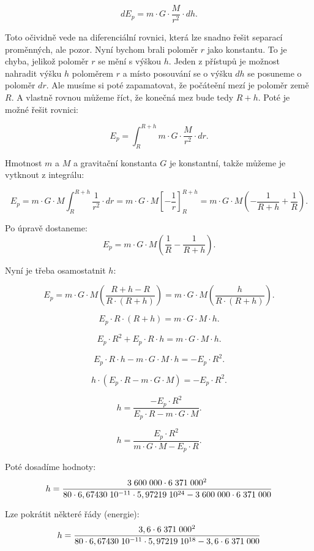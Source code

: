 \documentclass{article}
\begin{document}
$$
    dE_p = m \cdot G \cdot \frac{M}{r^2} \cdot dh.
$$

Toto očividně vede na diferenciální rovnici, která lze snadno řešit separací proměnných, ale pozor. Nyní bychom brali poloměr $r$ jako konstantu. To je chyba, jelikož poloměr $r$ se mění s výškou $h$. Jeden z přístupů je možnost nahradit výšku $h$ poloměrem $r$ a místo posouvání se o výšku $dh$ se posuneme o poloměr $dr$. Ale musíme si poté zapamatovat, že počáteění mezí je poloměr země $R$. A vlastně rovnou můžeme říct, že konečná mez bude tedy $R + h$. Poté je možné řešit rovnici:

$$
    E_p = \int_{R}^{R + h} m \cdot G \cdot \frac{M}{r^2} \cdot dr.
$$

Hmotnost $m$ a $M$ a gravitační konstanta $G$ je konstantní, takže můžeme je vytknout z integrálu:

$$
    E_p = m \cdot G \cdot M \int_{R}^{R + h} \frac{1}{r^2} \cdot dr = m \cdot G \cdot M \left[ - \frac{1}{r} \right]_{R}^{R + h} = m \cdot G \cdot M \left( - \frac{1}{R + h} + \frac{1}{R} \right).
$$

Po úpravě dostaneme:
$$
    E_p = m \cdot G \cdot M \left( \frac{1}{R} - \frac{1}{R + h} \right).
$$

Nyní je třeba osamostatnit $h$:

$$
    E_p = m \cdot G \cdot M \left( \frac{R + h - R}{R \cdot (R + h)} \right) = m \cdot G \cdot M \left( \frac{h}{R \cdot (R + h)} \right).
$$

$$
    E_p \cdot R \cdot (R + h) = m \cdot G \cdot M \cdot h.
$$

$$
    E_p \cdot R^2 + E_p \cdot R \cdot h = m \cdot G \cdot M \cdot h.
$$

$$
    E_p \cdot R \cdot h - m \cdot G \cdot M \cdot h = - E_p \cdot R^2.
$$

$$
    h \cdot (E_p \cdot R - m \cdot G \cdot M) = - E_p \cdot R^2.
$$

$$
    h = \frac{- E_p \cdot R^2}{E_p \cdot R - m \cdot G \cdot M}.
$$

$$
    h = \frac{E_p \cdot R^2}{m \cdot G \cdot M - E_p \cdot R}.
$$

Poté dosadíme hodnoty:
$$
    h = \frac{3 \; 600 \; 000 \cdot 6 \; 371 \; 000^2}{80 \cdot 6,67430 \; 10^{-11} \cdot 5,97219 \; 10^{24} - 3 \; 600 \; 000 \cdot 6 \; 371 \; 000}
$$

Lze pokrátit některé řády (energie):
$$
    h = \frac{3,6 \cdot 6 \; 371 \; 000^2}{80 \cdot 6,67430 \; 10^{-11} \cdot 5,97219 \; 10^{18} - 3,6 \cdot 6 \; 371 \; 000}
$$
\end{document}
